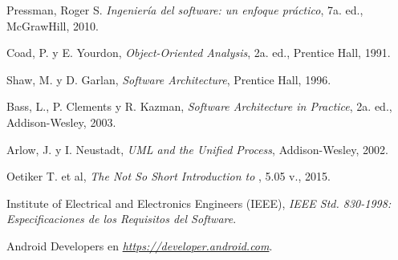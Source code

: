 \begin{thebibliography}{} %
	
	Pressman, Roger S.
	\emph{Ingeniería del software: un enfoque práctico},
	7a. ed.,
	McGrawHill,
	2010.
	
	Coad, P. y E. Yourdon, 
	\emph{Object-Oriented Analysis}, 
	2a. ed., 
	Prentice Hall, 
	1991.
	
	Shaw, M. y D. Garlan, 
	\emph{Software Architecture}, 
	Prentice Hall, 
	1996.
	
	Bass, L., P. Clements y R. Kazman, 
	\emph{Software Architecture in Practice}, 
	2a. ed., 
	Addison-Wesley, 
	2003.
	
	Arlow, J. y I. Neustadt, 
	\emph{UML and the Unified Process}, 
	Addison-Wesley, 
	2002.
	
	Oetiker T. et al,
	\emph{The Not So Short Introduction to \LaTeXe},
	5.05 v.,
	2015.
	
	Institute of Electrical and Electronics Engineers (IEEE),
	\emph{IEEE Std. 830-1998: Especificaciones de los Requisitos del Software}.
	
	Android Developers en
	\emph{\url{https://developer.android.com}}.
		
\end{thebibliography}